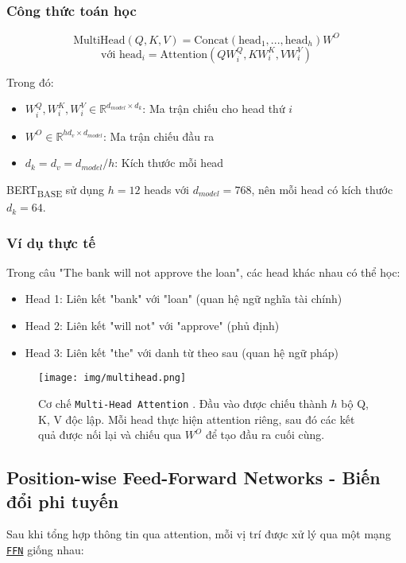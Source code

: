 \subsubsection{Công thức toán học}
$$ \text{MultiHead}(Q, K, V) = \text{Concat}(\text{head}_1, ..., \text{head}_h)W^O $$
$$ \text{với } \text{head}_i = \text{Attention}(QW_i^Q, KW_i^K, VW_i^V) $$

Trong đó:
\begin{itemize}
    \item $W_i^Q, W_i^K, W_i^V \in \mathbb{R}^{d_{model} \times d_k}$: Ma trận chiếu cho head thứ $i$
    \item $W^O \in \mathbb{R}^{hd_v \times d_{model}}$: Ma trận chiếu đầu ra
    \item $d_k = d_v = d_{model}/h$: Kích thước mỗi head
\end{itemize}

BERT\textsubscript{BASE} sử dụng $h=12$ heads với $d_{model}=768$, nên mỗi head có kích thước $d_k=64$.
\subsubsection{Ví dụ thực tế}
Trong câu "The bank will not approve the loan", các head khác nhau có thể học:
\begin{itemize}
    \item Head 1: Liên kết "bank" với "loan" (quan hệ ngữ nghĩa tài chính)
    \item Head 2: Liên kết "will not" với "approve" (phủ định)
    \item Head 3: Liên kết "the" với danh từ theo sau (quan hệ ngữ pháp)
\end{itemize}

\begin{figure}[H]
    \centering
    \texttt{[image: img/multihead.png]}
    \caption{Cơ chế \texttt{Multi-Head Attention} \cite{vaswani2017attention}.
    Đầu vào được chiếu thành $h$ bộ Q, K, V độc lập.
    Mỗi head thực hiện attention riêng, sau đó các kết quả được nối lại và chiếu qua $W^O$ để tạo đầu ra cuối cùng.}
    \label{fig:multi_head_attention}
\end{figure}

\subsection{Position-wise Feed-Forward Networks - Biến đổi phi tuyến}
\label{ssec:feed_forward_networks}
Sau khi tổng hợp thông tin qua attention, mỗi vị trí được xử lý qua một mạng \hyperref[acro:ffn]{\texttt{FFN}} giống nhau:

